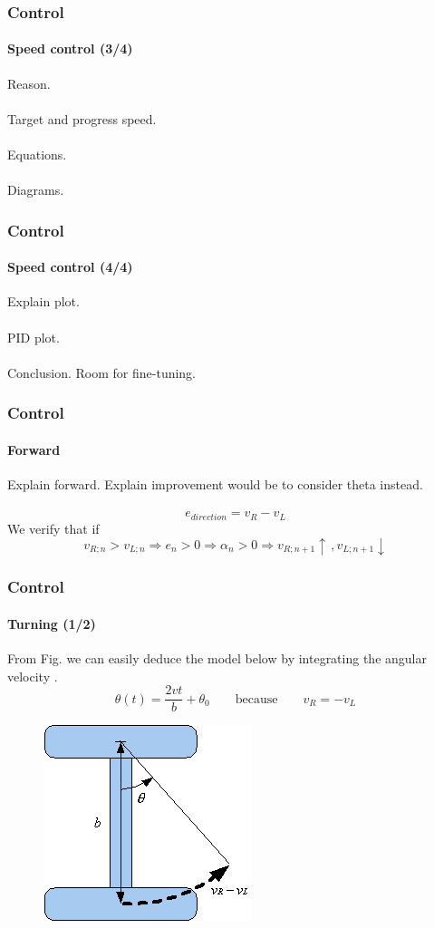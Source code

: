 \documentclass{beamer}
\begin{document}

\begin{frame}
\frametitle{Control}
\framesubtitle{Speed control (3/4)}
Reason.\\~\\
Target and progress speed.\\~\\
Equations.\\~\\
Diagrams.
\end{frame}


\begin{frame}
\frametitle{Control}
\framesubtitle{Speed control (4/4)}
Explain plot.\\~\\
PID plot.\\~\\
Conclusion. Room for fine-tuning.
\end{frame}


\begin{frame}
\frametitle{Control}
\framesubtitle{Forward}
Explain forward. Explain improvement would be to consider theta instead.\\~\\
$$
e_{direction} = v_R - v_L
$$
We verify that if
$$
v_{R;n} > v_{L;n} \Rightarrow e_n > 0  \Rightarrow \alpha_n > 0  \Rightarrow v_{R;n+1}\uparrow \, , v_{L;n+1}\downarrow
$$
\end{frame}


\begin{frame}
\frametitle{Control}
\framesubtitle{Turning (1/2)}
From Fig. we can easily deduce the model below by integrating the angular velocity .
$$
\theta(t) = \frac{2vt}{b} + \theta_0
\qquad\text{because}\qquad	
v_R = -v_L
$$
\begin{figure}[hbtp]
\centering
\includegraphics[scale=0.5]{figures/differential-system.jpg}
\end{figure}
\end{frame}
\end{document}
